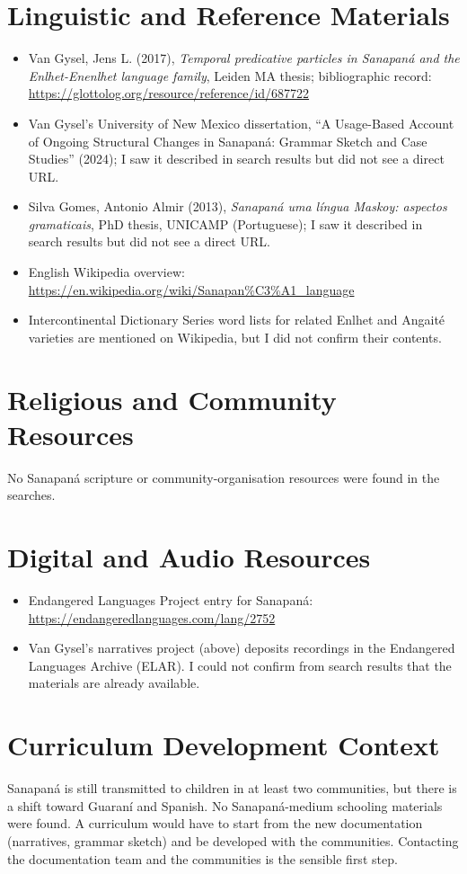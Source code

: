 \documentclass[12pt]{article}
\begin{document}
\section{Linguistic and Reference Materials}
\begin{itemize}
\item Van Gysel, Jens L. (2017), \emph{Temporal predicative particles in Sanapan\'a and the Enlhet-Enenlhet language family}, Leiden MA thesis; bibliographic record: \url{https://glottolog.org/resource/reference/id/687722}
\item Van Gysel's University of New Mexico dissertation, ``A Usage-Based Account of Ongoing Structural Changes in Sanapan\'a: Grammar Sketch and Case Studies'' (2024); I saw it described in search results but did not see a direct URL.
\item Silva Gomes, Antonio Almir (2013), \emph{Sanapan\'a uma l\'ingua Maskoy: aspectos gramaticais}, PhD thesis, UNICAMP (Portuguese); I saw it described in search results but did not see a direct URL.
\item English Wikipedia overview: \url{https://en.wikipedia.org/wiki/Sanapan%C3%A1_language}
\item Intercontinental Dictionary Series word lists for related Enlhet and Angait\'e varieties are mentioned on Wikipedia, but I did not confirm their contents.
\end{itemize}

\section{Religious and Community Resources}
No Sanapan\'a scripture or community-organisation resources were found in the searches.

\section{Digital and Audio Resources}
\begin{itemize}
\item Endangered Languages Project entry for Sanapan\'a: \url{https://endangeredlanguages.com/lang/2752}
\item Van Gysel's narratives project (above) deposits recordings in the Endangered Languages Archive (ELAR). I could not confirm from search results that the materials are already available.
\end{itemize}

\section{Curriculum Development Context}
Sanapan\'a is still transmitted to children in at least two communities, but there is a shift toward Guaran\'i and Spanish. No Sanapan\'a-medium schooling materials were found. A curriculum would have to start from the new documentation (narratives, grammar sketch) and be developed with the communities. Contacting the documentation team and the communities is the sensible first step.
\end{document}
